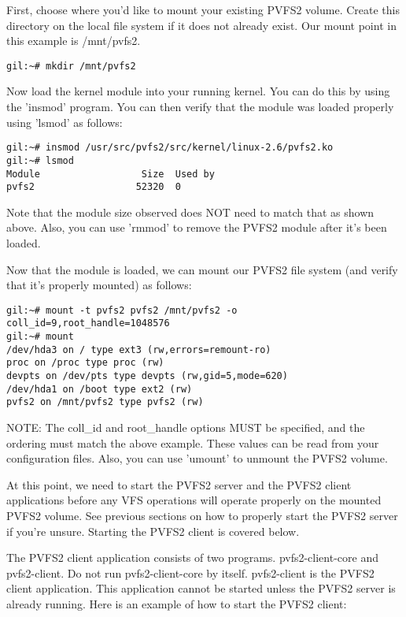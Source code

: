 \documentclass[11pt, letterpaper]{article}
\begin{document}
First, choose where you'd like to mount your existing PVFS2 volume.
Create this directory on the local file system if it does not already
exist.  Our mount point in this example is /mnt/pvfs2.

\begin{verbatim}
gil:~# mkdir /mnt/pvfs2
\end{verbatim}

Now load the kernel module into your running kernel.  You can do this
by using the 'insmod' program.  You can then verify that the module
was loaded properly using 'lsmod' as follows:

\begin{verbatim}
gil:~# insmod /usr/src/pvfs2/src/kernel/linux-2.6/pvfs2.ko
gil:~# lsmod
Module                  Size  Used by
pvfs2                  52320  0 
\end{verbatim}

Note that the module size observed does NOT need to match that as
shown above.  Also, you can use 'rmmod' to remove the PVFS2 module
after it's been loaded.

Now that the module is loaded, we can mount our PVFS2 file system (and
verify that it's properly mounted) as follows:

\begin{verbatim}
gil:~# mount -t pvfs2 pvfs2 /mnt/pvfs2 -o coll_id=9,root_handle=1048576
gil:~# mount
/dev/hda3 on / type ext3 (rw,errors=remount-ro)
proc on /proc type proc (rw)
devpts on /dev/pts type devpts (rw,gid=5,mode=620)
/dev/hda1 on /boot type ext2 (rw)
pvfs2 on /mnt/pvfs2 type pvfs2 (rw)
\end{verbatim}

NOTE: The coll\_id and root\_handle options MUST be specified, and the
ordering must match the above example.  These values can be read from
your configuration files.  Also, you can use 'umount' to unmount the
PVFS2 volume.

At this point, we need to start the PVFS2 server and the PVFS2 client
applications before any VFS operations will operate properly on the
mounted PVFS2 volume.  See previous sections on how to properly start
the PVFS2 server if you're unsure.  Starting the PVFS2 client is
covered below.

The PVFS2 client application consists of two programs.
pvfs2-client-core and pvfs2-client.  Do not run pvfs2-client-core by
itself.  pvfs2-client is the PVFS2 client application.  This
application cannot be started unless the PVFS2 server is already
running.  Here is an example of how to start the PVFS2 client:
\end{document}
